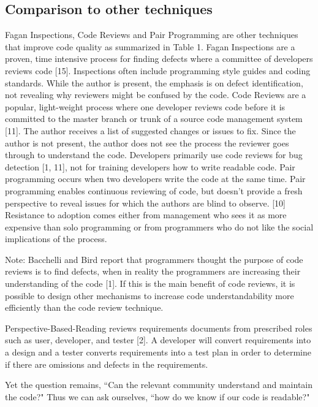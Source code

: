 \documentclass[conference]{IEEEtran}
\begin{document}
\subsection{Comparison to other techniques}
Fagan Inspections, Code Reviews and Pair Programming are other techniques that improve code quality as summarized in Table 1. Fagan Inspections are a proven, time intensive process for finding defects where a committee of developers reviews code [15]. Inspections often include programming style guides and coding standards. While the author is present, the emphasis is on defect identification, not revealing why reviewers might be confused by the code. Code Reviews are a popular, light-weight process where one developer reviews code before it is committed to the master branch or trunk of a source code management system [11]. The author receives a list of suggested changes or issues to fix. Since the author is not present, the author does not see the process the reviewer goes through to understand the code. Developers primarily use code reviews for bug detection [1, 11], not for training developers how to write readable code. Pair programming occurs when two developers write the code at the same time. Pair programming enables continuous reviewing of code, but doesn’t provide a fresh perspective to reveal issues for which the authors are blind to observe. [10] Resistance to adoption comes either from management who sees it as more expensive than solo programming or from programmers who do not like the social implications of the process.

Note: Bacchelli and Bird report that programmers thought the purpose of code reviews is to find defects, when in reality the programmers are increasing their understanding of the code [1]. If this is the main benefit of code reviews, it is possible to design other mechanisms to increase code understandability more efficiently than the code review technique.

Perspective-Based-Reading reviews requirements documents from prescribed roles such as user, developer, and tester [2]. A developer will convert requirements into a design and a tester converts requirements into a test plan in order to determine if there are omissions and defects in the requirements.

Yet the question remains, ``Can the relevant community understand and maintain the code?" Thus we can ask ourselves, ``how do we know if our code is readable?"
\end{document}

